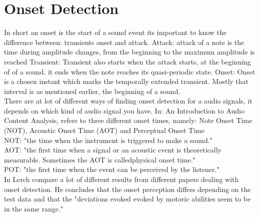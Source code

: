 \section{Onset Detection}
In short an onset is the start of a sound event \citep{ACA} 
its important to know the difference between: transients onset and attack. 
Attack: attack of a note is the time during amplitude changes, from the beginning to the maximum amplitude is reached \citep{ACA}
Transient: Transient also starts when the attack starts, at the beginning of of a sound. it ends when the note reaches its quasi-periodic state. \citep{ACA}
Onset: Onset is a chosen instant which marks the temporally extended transient. \citep{Bello2005} Mostly that interval is as mentioned earlier, the beginning of a sound. 
\\
There are at lot of different ways of  finding onset detection for a audio signals, it depends on which kind of audio signal you have.
In: An Introduction to Audio Content Analysis, \citep{ACA} refers to three different onset times, namely: Note Onset Time (NOT), Acoustic Onset Time (AOT) and Perceptual Onset Time 
\\
NOT: "the time when the instrument is triggered to make a sound." \citep{ACA}
\\
AOT: "the first time when a signal or an acoustic event is theoretically measurable. Sometimes the AOT is calledphysical onset time." \citep{ACA}
\\
POT: "the first time when the event can be perceived by the
listener." \citep{ACA}
\\
In \citep{ACA} Lerch compare a lot of different results from different papers dealing with onset detection. He concludes that the onset perception differs depending on the test data and that the "deviations evoked evoked by motoric abilities seem to be in the same range." \citep{ACA}
\\
